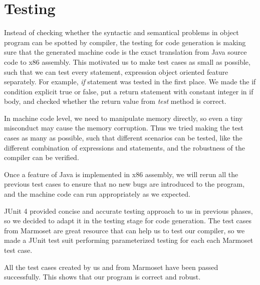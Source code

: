 \chapter{Testing}
\label{testing}
Instead of checking whether the syntactic and semantical problems in object program can be spotted by compiler, the testing for code generation is making sure that the generated machine code is the exact translation from Java source code to x86 assembly. This motivated us to make test cases as small as possible, such that we can test every statement, expression object oriented feature separately. For example, \textit{if} statement was tested in the first place. We made the if condition explicit true or false, put a return statement with constant integer in if body, and checked whether the return value from \textit{test} method is correct.

In machine code level, we need to manipulate memory directly, so even a tiny misconduct may cause the memory corruption. Thus we tried making the test cases as many as possible, such that different scenarios can be tested, like the different combination of expressions and statements, and the robustness of the compiler can be verified.     

Once a feature of Java is implemented in x86 assembly, we will rerun all the previous test cases to ensure that no new bugs are introduced to the program, and the machine code can run appropriately as we expected. 

JUnit 4 provided concise and accurate testing approach to us in previous phases, so we decided to adapt it in the testing stage for code generation. The test cases from Marmoset are great resource that can help us to test our compiler, so we made a JUnit test suit performing parameterized testing for each each Marmoset test case.

All the test cases created by us and from Marmoset have been passed successfully. This shows that our program is correct and robust. 